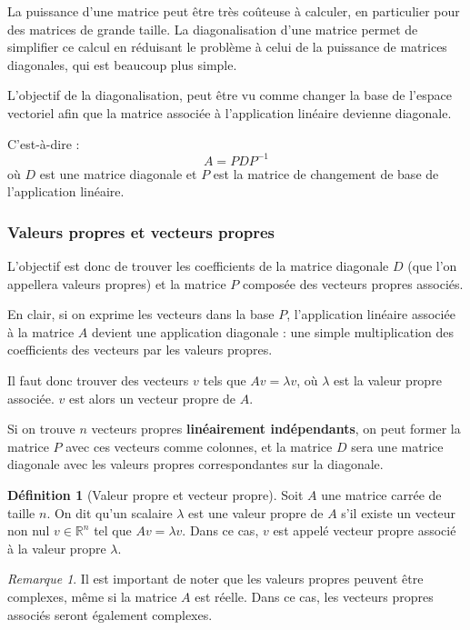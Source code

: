 \documentclass[11pt,a4paper]{article}
\numberwithin{equation}{section}
\theoremstyle{plain}
\theoremstyle{definition}
\newtheorem{definition}[theorem]{Définition}
\theoremstyle{remark}
\newtheorem*{remark}{Remarque}
\begin{document}
La puissance d'une matrice peut être très coûteuse à calculer, en particulier pour des matrices de grande taille. La diagonalisation d'une matrice permet de simplifier ce calcul en réduisant le problème à celui de la puissance de matrices diagonales, qui est beaucoup plus simple.

L'objectif de la diagonalisation, peut être vu comme changer la base de l'espace vectoriel afin que la matrice associée à l'application linéaire devienne diagonale.

C'est-à-dire :
\[
    A = PDP^{-1}
\]
où \(D\) est une matrice diagonale et \(P\) est la matrice de changement de base de l'application linéaire.

\subsubsection{Valeurs propres et vecteurs propres}

L'objectif est donc de trouver les coefficients de la matrice diagonale \(D\) (que l'on appellera valeurs propres) et la matrice $P$ composée des vecteurs propres associés.

En clair, si on exprime les vecteurs dans la base $P$, l'application linéaire associée à la matrice \(A\) devient une application diagonale : une simple multiplication des coefficients des vecteurs par les valeurs propres.

Il faut donc trouver des vecteurs \(v\) tels que \(Av = \lambda v\), où \(\lambda\) est la valeur propre associée. $v$ est alors un vecteur propre de \(A\).

Si on trouve $n$ vecteurs propres \textbf{linéairement indépendants}, on peut former la matrice \(P\) avec ces vecteurs comme colonnes, et la matrice \(D\) sera une matrice diagonale avec les valeurs propres correspondantes sur la diagonale.

\begin{definition}[Valeur propre et vecteur propre]
    Soit \(A\) une matrice carrée de taille \(n\). On dit qu'un scalaire \(\lambda\) est une valeur propre de \(A\) s'il existe un vecteur non nul \(v \in \mathbb{R}^n\) tel que \(Av = \lambda v\). Dans ce cas, \(v\) est appelé vecteur propre associé à la valeur propre \(\lambda\).
\end{definition}

\begin{remark}
Il est important de noter que les valeurs propres peuvent être complexes, même si la matrice \(A\) est réelle. Dans ce cas, les vecteurs propres associés seront également complexes.
\end{remark}
\end{document}
